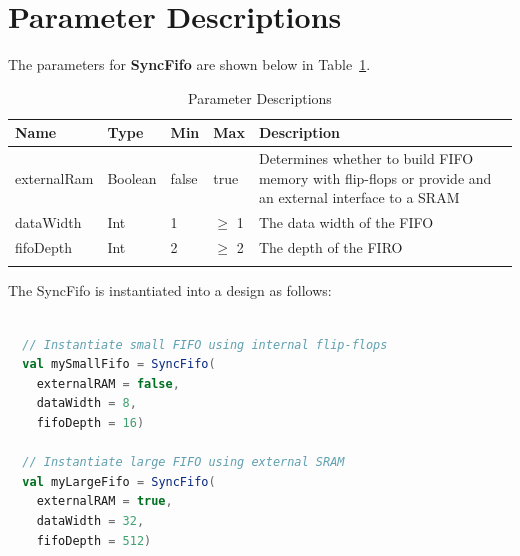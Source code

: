 
\section{Parameter Descriptions}

The parameters for \textbf{SyncFifo} are shown below in
Table~\ref{table:params}.

\renewcommand*{\arraystretch}{1.4}
\begin{longtable}[H]{
    | p{}
    | p{}
    | p{}
    | p{}
    | p{} |
  }
  \hline
  \textbf{Name} &
  \textbf{Type} &
  \textbf{Min}  &
  \textbf{Max}  &
  \textbf{Description}            \\ \hline \hline

  externalRam   &
  Boolean       &
  false         &
  true          &
  Determines whether to build FIFO memory with flip-flops or provide and
  an external interface to a SRAM \\ \hline

  dataWidth     &
  Int           &
  1             &
  $\ge$ 1       &
  The data width of the FIFO      \\ \hline

  fifoDepth     &
  Int           &
  2             &
  $\ge$ 2       &
  The depth of the FIRO           \\ \hline

  \caption{Parameter Descriptions}\label{table:params}
\end{longtable}

The SyncFifo is instantiated into a design as follows:

\begin{lstlisting}[language=Scala]

  // Instantiate small FIFO using internal flip-flops
  val mySmallFifo = SyncFifo(
    externalRAM = false, 
    dataWidth = 8, 
    fifoDepth = 16) 

  // Instantiate large FIFO using external SRAM
  val myLargeFifo = SyncFifo(
    externalRAM = true, 
    dataWidth = 32, 
    fifoDepth = 512) 

  \end{lstlisting}